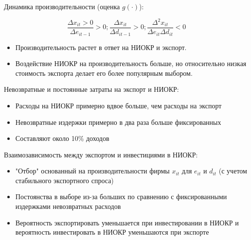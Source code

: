 \documentclass[c, dvipsnames]{beamer}  %
\begin{document}
\begin{frame}[shrink=3]
\frametitle{\insertsection} 


Динамика производительности (оценка  $g(·)$):

$$\dfrac{ \Delta x_{it}>0}{\Delta e_{it-1}} > 0; \dfrac{\Delta x_{it}}{\Delta d_{it−1}}> 0; \dfrac{\Delta^2x_{it}}{\Delta e_{it}\Delta d_{it}}< 0$$



\begin{itemize}
	\item Производительность растет в ответ на НИОКР и экспорт.
	\item Воздействие НИОКР на производительность больше,  но относительно низкая стоимость экспорта делает его более популярным выбором.

\end{itemize}


Невозвратные  и постоянные затраты на экспорт и НИОКР:

\begin{itemize}
\item  Расходы на НИОКР примерно вдвое больше, чем расходы на экспорт 
\item  Невозвратные издержки  примерно в два раза больше фиксированных 
\item  Составляют около 10\% доходов
\end{itemize}

Взаимозависимость между экспортом и инвестициями в НИОКР:
\begin{itemize}
\item  "Отбор" основанный на производительности фирмы $x_{it}$ для  $e_{it}$ и $d_{it}$ (с учетом стабильного экспортного спроса)
\item   Постоянства в выборе из-за больших по сравнению с фиксированными издержками  невозвратных расходов
\item Вероятность экспортировать уменьшается при инвестировании  в НИОКР и вероятность
инвестировать  в НИОКР уменьшаются при экспорте

\end{itemize}






\end{frame}
\end{document}
